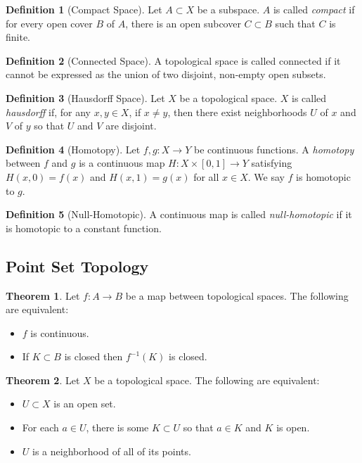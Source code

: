 \documentclass{article}
\theoremstyle{definition}
\newtheorem{definition}{Definition}[subsection]
\newtheorem{theorem}{Theorem}[subsection]
\begin{document}
    \begin{definition}[Compact Space]
        Let $A\subset X$ be a subspace. $A$ is called \textit{compact} if for every open cover $B$ of $A$, there is an open subcover $C\subset B$ such that $C$ is finite.
    \end{definition}
    \begin{definition}[Connected Space]
        A topological space is called connected if it cannot be expressed as the union of two disjoint, non-empty open subsets.
    \end{definition}
    \begin{definition}[Hausdorff Space]
        Let $X$ be a topological space. $X$ is called \textit{hausdorff} if, for any $x,y\in X$, if $x\neq y$, then there exist neighborhoods $U$ of $x$ and $V$ of $y$ so that $U$ and $V$ are disjoint.
    \end{definition}
    \begin{definition}[Homotopy]
        Let $f,g:X\rightarrow Y$ be continuous functions. A \textit{homotopy} between $f$ and $g$ is a continuous map $H:X\times [0,1]\rightarrow Y$ satisfying $H(x,0)=f(x)$ and $H(x,1)=g(x)$ for all $x\in X$. We say $f$ is homotopic to $g$.
    \end{definition}
    \begin{definition}[Null-Homotopic]
        A continuous map is called \textit{null-homotopic} if it is homotopic to a constant function.
    \end{definition}


\subsection{Point Set Topology}
\begin{theorem}
    Let $f:A\rightarrow B$ be a map between topological spaces. The following are equivalent:
    \begin{itemize}
        \item $f$ is continuous.
        \item If $K\subset B$ is closed then $f^{-1}(K)$ is closed.
    \end{itemize}
\end{theorem}

\begin{theorem}
    Let $X$ be a topological space. The following are equivalent:
    \begin{itemize}
        \item $U\subset X$ is an open set.
        \item For each $a\in U$, there is some $K\subset U$ so that $a\in K$ and $K$ is open.
        \item $U$ is a neighborhood of all of its points.
    \end{itemize}
\end{theorem}
\end{document}
